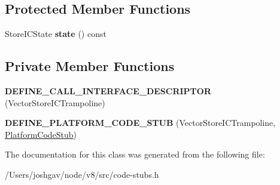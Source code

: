 \subsection*{Protected Member Functions}
\begin{DoxyCompactItemize}
\item 
Store\+I\+C\+State {\bfseries state} () const \hypertarget{classv8_1_1internal_1_1_vector_store_i_c_trampoline_stub_ae039bc26d51fa604d18eb43c0302a9e7}{}\label{classv8_1_1internal_1_1_vector_store_i_c_trampoline_stub_ae039bc26d51fa604d18eb43c0302a9e7}

\end{DoxyCompactItemize}
\subsection*{Private Member Functions}
\begin{DoxyCompactItemize}
\item 
{\bfseries D\+E\+F\+I\+N\+E\+\_\+\+C\+A\+L\+L\+\_\+\+I\+N\+T\+E\+R\+F\+A\+C\+E\+\_\+\+D\+E\+S\+C\+R\+I\+P\+T\+OR} (Vector\+Store\+I\+C\+Trampoline)\hypertarget{classv8_1_1internal_1_1_vector_store_i_c_trampoline_stub_a7118767d0016d18e26359995e8ca4270}{}\label{classv8_1_1internal_1_1_vector_store_i_c_trampoline_stub_a7118767d0016d18e26359995e8ca4270}

\item 
{\bfseries D\+E\+F\+I\+N\+E\+\_\+\+P\+L\+A\+T\+F\+O\+R\+M\+\_\+\+C\+O\+D\+E\+\_\+\+S\+T\+UB} (Vector\+Store\+I\+C\+Trampoline, \hyperlink{classv8_1_1internal_1_1_platform_code_stub}{Platform\+Code\+Stub})\hypertarget{classv8_1_1internal_1_1_vector_store_i_c_trampoline_stub_a0199edf3521aa469fbc8e8f6406a4fa6}{}\label{classv8_1_1internal_1_1_vector_store_i_c_trampoline_stub_a0199edf3521aa469fbc8e8f6406a4fa6}

\end{DoxyCompactItemize}


The documentation for this class was generated from the following file\+:\begin{DoxyCompactItemize}
\item 
/\+Users/joshgav/node/v8/src/code-\/stubs.\+h\end{DoxyCompactItemize}
